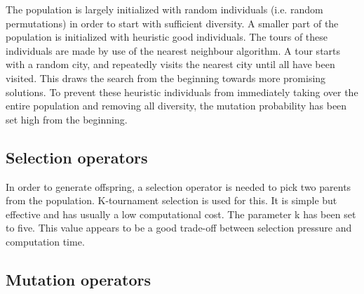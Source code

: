 \documentclass[a4paper,10pt]{article}
\newcommand{\ReplaceMe}[1]{{\color{blue}#1}}
\begin{document}
The population is largely initialized with random individuals (i.e. random permutations) in order to start with sufficient diversity. A smaller part of the population is initialized with heuristic good individuals. The tours of these individuals are made by use of the nearest neighbour algorithm. A tour starts with a random city, and repeatedly visits the nearest city until all have been visited. This draws the search from the beginning towards more promising solutions. To prevent these heuristic individuals from immediately taking over the entire population and removing all diversity, the mutation probability has been set high from the beginning. 


\subsection{Selection operators}\label{ssec:selection}


In order to generate offspring, a selection operator is needed to pick two parents from the population. K-tournament selection is used for this. It is simple but effective and has usually a low computational cost. The parameter k has been set to five. This value appears to be a good trade-off between selection pressure and computation time. 

\subsection{Mutation operators}\label{ssec:mutation}
\end{document}
